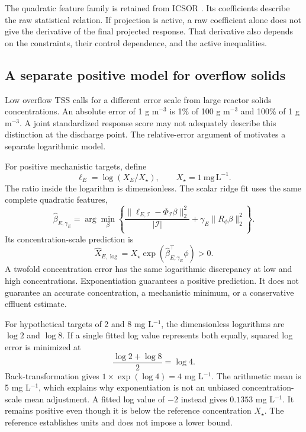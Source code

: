 The quadratic feature family is retained from ICSOR \citep{Selerio2026}. Its coefficients describe the raw statistical relation. If projection is active, a raw coefficient alone does not give the derivative of the final projected response. That derivative also depends on the constraints, their control dependence, and the active inequalities.

\subsection{A separate positive model for overflow solids}

Low overflow TSS calls for a different error scale from large reactor solids concentrations. An absolute error of 1 g m$^{-3}$ is 1\% of 100 g m$^{-3}$ and 100\% of 1 g m$^{-3}$. A joint standardized response score may not adequately describe this distinction at the discharge point. The relative-error argument of \citet{Tofallis2015} motivates a separate logarithmic model.

For positive mechanistic targets, define
\begin{equation}
\ell_E=\log(X_E/X_\star),\qquad X_\star=1\ \mathrm{mg\,L^{-1}}.
\label{eq:plant_log_target}
\end{equation}
The ratio inside the logarithm is dimensionless. The scalar ridge fit uses the same complete quadratic features,
\begin{equation}
\widehat\beta_{E,\gamma_E}=\arg\min_\beta
\left\{\frac{\|\ell_{E,\mathcal I}-\Phi_{\mathcal I}\beta\|_2^2}{|\mathcal I|}
+\gamma_E\|R_\phi\beta\|_2^2\right\}.
\end{equation}
Its concentration-scale prediction is
\begin{equation}
\widehat X_{E,\log}=X_\star\exp\left(\widehat\beta_{E,\gamma_E}^\top\phi\right)>0.
\label{eq:plant_log_prediction}
\end{equation}
A twofold concentration error has the same logarithmic discrepancy at low and high concentrations. Exponentiation guarantees a positive prediction. It does not guarantee an accurate concentration, a mechanistic minimum, or a conservative effluent estimate.

For hypothetical targets of 2 and 8 mg L$^{-1}$, the dimensionless logarithms are $\log2$ and $\log8$. If a single fitted log value represents both equally, squared log error is minimized at
\begin{equation}
\frac{\log2+\log8}{2}=\log4.
\end{equation}
Back-transformation gives $1\times\exp(\log4)=4$ mg L$^{-1}$. The arithmetic mean is 5 mg L$^{-1}$, which explains why exponentiation is not an unbiased concentration-scale mean adjustment. A fitted log value of $-2$ instead gives $0.1353$ mg L$^{-1}$. It remains positive even though it is below the reference concentration $X_\star$. The reference establishes units and does not impose a lower bound.

